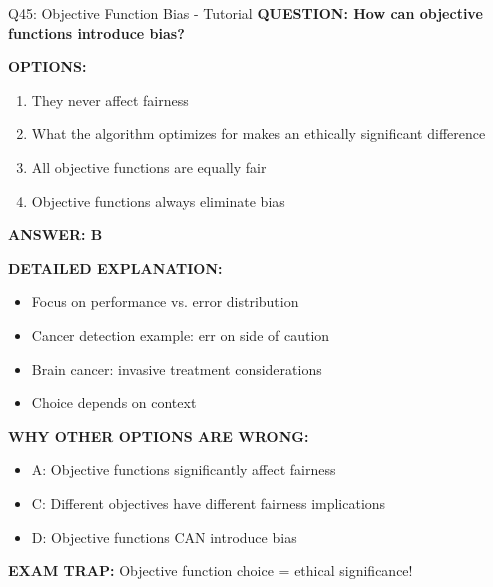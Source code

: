 \documentclass[8pt]{beamer}
\begin{document}
	\begin{frame}{Q45: Objective Function Bias - Tutorial}
		\fontsize{6.5}{7.5}\selectfont
		\textbf{QUESTION: How can objective functions introduce bias?}
		
		\vspace{0.1cm}
		\textbf{OPTIONS:}
		\begin{enumerate}
			\item They never affect fairness
			\item What the algorithm optimizes for makes an ethically significant difference
			\item All objective functions are equally fair
			\item Objective functions always eliminate bias
		\end{enumerate}
		
		\vspace{0.1cm}
		\textcolor{myblue}{\textbf{ANSWER: B}}
		
		\vspace{0.1cm}
		\textbf{DETAILED EXPLANATION:}
		\begin{itemize}
			\item Focus on performance vs. error distribution
			\item Cancer detection example: err on side of caution
			\item Brain cancer: invasive treatment considerations
			\item Choice depends on context
		\end{itemize}
		
		\vspace{0.1cm}
		\textcolor{myred}{\textbf{WHY OTHER OPTIONS ARE WRONG:}}
		\begin{itemize}
			\item \textcolor{myred}{A:} Objective functions significantly affect fairness
			\item \textcolor{myred}{C:} Different objectives have different fairness implications
			\item \textcolor{myred}{D:} Objective functions CAN introduce bias
		\end{itemize}
		
		\textcolor{myred}{\textbf{EXAM TRAP:}} Objective function choice = \textcolor{myblue}{ethical significance}!
	\end{frame}
	
\end{document}
